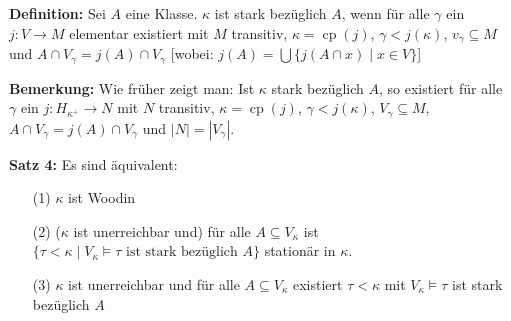 \documentclass[a4paper,fontsize=11pt]{scrartcl}
\newcommand{\cp}{\operatorname{cp}}
\begin{document}
{\bf Definition:} Sei $A$ eine Klasse.
	$\kappa$ ist stark bezüglich $A$, wenn für alle $\gamma$ ein $j\colon V\to M$ elementar existiert mit $M$ transitiv, $\kappa=\cp(j)$, $\gamma<j(\kappa)$, $v_{\gamma}\subseteq M$ und $A\cap V_{\gamma}= j(A)\cap V_{\gamma}$
	[wobei: $j(A)=\bigcup \{j(A\cap x)\mid x\in V\}$]

{\bf Bemerkung:} Wie früher zeigt man: Ist $\kappa$ stark bezüglich $A$, so existiert für alle $\gamma$ ein $j\colon H_{\kappa^+}\to N$ mit $N$ transitiv, $\kappa=\cp(j)$, $\gamma<j(\kappa)$, $V_{\gamma}\subseteq M$, $A\cap V_\gamma= j(A)\cap V_\gamma$ und $|N|=|V_\gamma|$.

{\bf Satz 4:} Es sind äquivalent:
	\begin{itemize}
		\item[(1)] $\kappa$ ist Woodin
		\item[(2)] ($\kappa$ ist unerreichbar und) für alle $A\subseteq V_{\kappa}$ ist $\{\tau<\kappa\mid V_{\kappa}\models \tau \mbox{ ist stark bezüglich } A\}$ stationär in $\kappa$.
		\item[(3)] $\kappa$ ist unerreichbar und für alle $A\subseteq V_{\kappa}$ existiert $\tau<\kappa$ mit $V_{\kappa}\models \tau$ ist stark bezüglich $A$
	\end{itemize}
\end{document}
